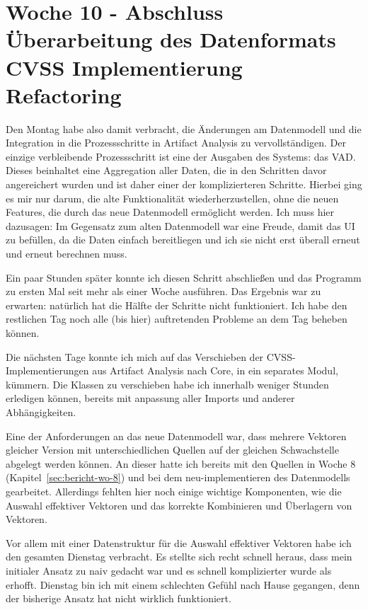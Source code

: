 \section{Woche 10 - Abschluss Überarbeitung des Datenformats \headerand CVSS Implementierung Refactoring} \label{sec:bericht-wo-10}



Den Montag habe also damit verbracht, die Änderungen am Datenmodell und die Integration in die Prozessschritte in Artifact Analysis zu vervollständigen.
Der einzige verbleibende Prozessschritt ist eine der Ausgaben des Systems: das VAD\@.
Dieses beinhaltet eine Aggregation aller Daten, die in den Schritten davor angereichert wurden und ist daher einer der komplizierteren Schritte.
Hierbei ging es mir nur darum, die alte Funktionalität wiederherzustellen, ohne die neuen Features, die durch das neue Datenmodell ermöglicht werden.
Ich muss hier dazusagen: Im Gegensatz zum alten Datenmodell war eine Freude, damit das UI zu befüllen, da die Daten einfach bereitliegen und ich sie nicht erst überall erneut und erneut berechnen muss.

Ein paar Stunden später konnte ich diesen Schritt abschließen und das Programm zu ersten Mal seit mehr als einer Woche ausführen.
Das Ergebnis war zu erwarten: natürlich hat die Hälfte der Schritte nicht funktioniert.
Ich habe den restlichen Tag noch alle (bis hier) auftretenden Probleme an dem Tag beheben können.


Die nächsten Tage konnte ich mich auf das Verschieben der CVSS-Implementierungen aus Artifact Analysis nach Core, in ein separates Modul, kümmern.
Die Klassen zu verschieben habe ich innerhalb weniger Stunden erledigen können, bereits mit anpassung aller Imports und anderer Abhängigkeiten.

Eine der Anforderungen an das neue Datenmodell war, dass mehrere Vektoren gleicher Version mit unterschiedlichen Quellen auf der gleichen Schwachstelle abgelegt werden können.
An dieser hatte ich bereits mit den Quellen in Woche 8 (Kapitel\ \ref{sec:bericht-wo-8}) und bei dem neu-implementieren des Datenmodells gearbeitet.
Allerdings fehlten hier noch einige wichtige Komponenten, wie die Auswahl effektiver Vektoren und das korrekte Kombinieren und Überlagern von Vektoren.

Vor allem mit einer Datenstruktur für die Auswahl effektiver Vektoren habe ich den gesamten Dienstag verbracht.
Es stellte sich recht schnell heraus, dass mein initialer Ansatz zu naiv gedacht war und es schnell komplizierter wurde als erhofft.
Dienstag bin ich mit einem schlechten Gefühl nach Hause gegangen, denn der bisherige Ansatz hat nicht wirklich funktioniert.

